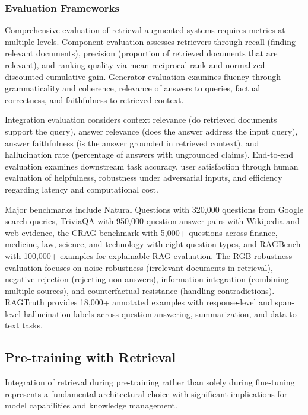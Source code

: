 \subsubsection{Evaluation Frameworks}

Comprehensive evaluation of retrieval-augmented systems requires metrics at multiple levels. Component evaluation assesses retrievers through recall (finding relevant documents), precision (proportion of retrieved documents that are relevant), and ranking quality via mean reciprocal rank and normalized discounted cumulative gain. Generator evaluation examines fluency through grammaticality and coherence, relevance of answers to queries, factual correctness, and faithfulness to retrieved context.

Integration evaluation considers context relevance (do retrieved documents support the query), answer relevance (does the answer address the input query), answer faithfulness (is the answer grounded in retrieved context), and hallucination rate (percentage of answers with ungrounded claims). End-to-end evaluation examines downstream task accuracy, user satisfaction through human evaluation of helpfulness, robustness under adversarial inputs, and efficiency regarding latency and computational cost.

Major benchmarks include Natural Questions with 320,000 questions from Google search queries, TriviaQA with 950,000 question-answer pairs with Wikipedia and web evidence, the CRAG benchmark with 5,000+ questions across finance, medicine, law, science, and technology with eight question types, and RAGBench with 100,000+ examples for explainable RAG evaluation. The RGB robustness evaluation focuses on noise robustness (irrelevant documents in retrieval), negative rejection (rejecting non-answers), information integration (combining multiple sources), and counterfactual resistance (handling contradictions). RAGTruth provides 18,000+ annotated examples with response-level and span-level hallucination labels across question answering, summarization, and data-to-text tasks.

\subsection{Pre-training with Retrieval}

Integration of retrieval during pre-training rather than solely during fine-tuning represents a fundamental architectural choice with significant implications for model capabilities and knowledge management.

